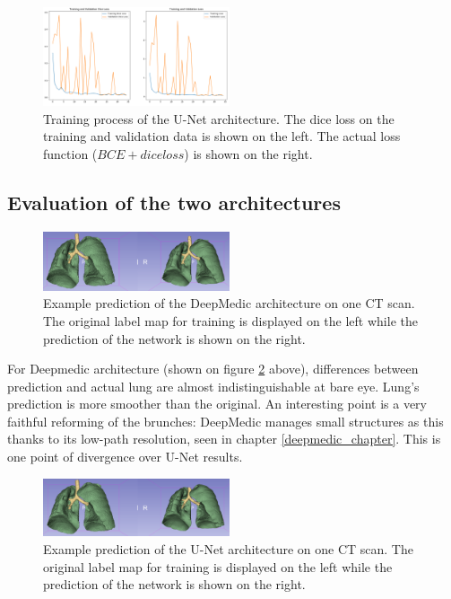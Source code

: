 \begin{figure}[h!]
	\includegraphics[width=0.49\textwidth, angle=0]{files/jpgunettrain.png}
	\caption{Training process of the U-Net architecture. The dice loss on the training and validation data is shown on the left. The actual loss function ($BCE + dice loss$) is shown on the right.}
	\label{train_unet}
\end{figure}

\subsection{Evaluation of the two architectures}

\begin{figure}[h!]
	\includegraphics[width=0.49\textwidth, angle=0]{files/preddeepmedic.png}
	\caption{Example prediction of the DeepMedic architecture on one CT scan. The original label map for training is displayed on the left while the prediction of the network is shown on the right.}
	\label{pred_deepmedic}
\end{figure}

For Deepmedic architecture (shown on figure \ref{pred_deepmedic} above), differences between prediction and actual lung are almost indistinguishable at bare eye. Lung's prediction is more smoother than the original. An interesting point is a very faithful reforming of the brunches: DeepMedic manages small structures as this thanks to its low-path resolution, seen in chapter \ref{deepmedic_chapter}. This is one point of divergence over U-Net results.\newline

\begin{figure}[h!]
	\includegraphics[width=0.49\textwidth, angle=0]{files/predunet.png}
	\caption{Example prediction of the U-Net architecture on one CT scan. The original label map for training is displayed on the left while the prediction of the network is shown on the right.}
	\label{pred_unet}
\end{figure}

